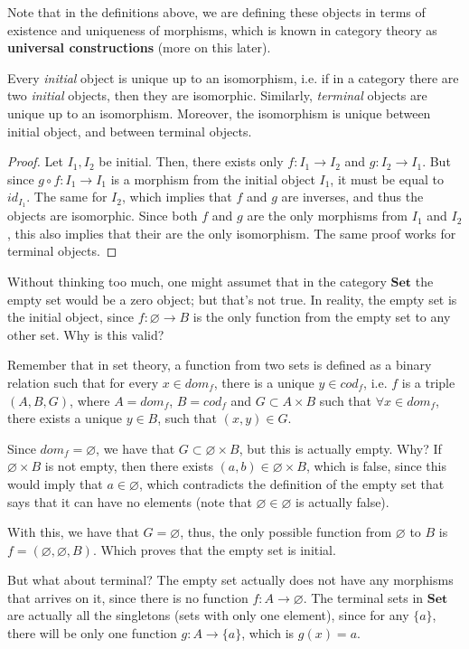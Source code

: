 Note that in the definitions above, we are defining these objects in terms of existence and
uniqueness of morphisms, which is known in category theory as \textbf{universal constructions}
(more on this later).

\begin{theorem}
	Every \textit{initial} object is unique up to an isomorphism, i.e. if in a category there
	are two \textit{initial} objects, then they are isomorphic.
	Similarly, \textit{terminal} objects are unique up to an isomorphism.
	Moreover, the isomorphism is unique between initial object, and between terminal objects.
\end{theorem}
\begin{proof}
	Let $I_1, I_2$ be initial. Then, there exists only $f:I_1 \to I_2$ and $g:I_2 \to I_1$.
	But since $g \circ f:I_1 \to I_1$ is a morphism from the initial object $I_1$, it must
	be equal to $id_{I_1}$. The same for $I_2$, which implies that $f$ and $g$ are inverses,
	and thus the objects are isomorphic. Since both $f$ and $g$ are the only morphisms from
	$I_1$ and $I_2$, this also implies that their are the only isomorphism.
	The same proof works for terminal objects.
\end{proof}


\begin{example}
	Without thinking too much, one might assumet that in the category $\mathbf{Set}$
	the empty set would be a zero object; but that's not true.
	In reality, the empty set is the initial object, since $f:\varnothing \to B$
	is the only function from the empty set to any other set. Why is this valid?

	Remember that in set theory, a function from two sets is defined as a binary
	relation such that for every $x \in dom_f$, there is a unique $y \in cod_f$, i.e.
	$f$ is a triple $(A,B,G)$, where $A = dom_f$, $B = cod_f$ and $G \subset A \times B$
	such that $\forall x \in dom_f$, there exists a unique $y \in B$, such that $(x,y) \in G$.

	Since $dom_f = \varnothing$, we have that $G \subset \varnothing \times B$, but this
	is actually empty. Why? If $\varnothing \times B$ is not empty, then there exists
	$(a,b) \in \varnothing \times B$, which is false, since this would imply that
	$a \in \varnothing$, which contradicts the definition of the empty set that says
	that it can have no elements (note that $\varnothing \in \varnothing$ is actually false).

	With this, we have that $G = \varnothing$, thus, the only possible function from
	$\varnothing$ to $B$ is $f = (\varnothing, \varnothing, B)$. Which proves that the
	empty set is initial.

	But what about terminal? The empty set actually does not have any morphisms
	that arrives on it, since there is no function $f:A \to \varnothing$.
	The terminal sets in $\mathbf{Set}$ are actually all the singletons (sets with only
	one element), since for any $\{a\}$, there will be only one function
	$g: A \to \{a\}$, which is $g(x) = a$.
	\label{ex:InitialTerminalSet}
\end{example}

